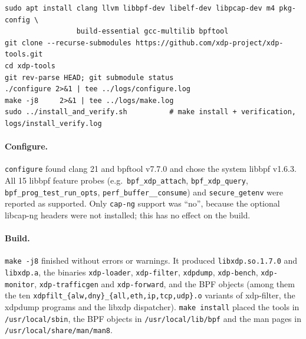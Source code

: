 \begin{lstlisting}[style=bashsh,float=htbp,caption={Download, configure, build and install xdp-tools.},label=lst:t5-build]
sudo apt install clang llvm libbpf-dev libelf-dev libpcap-dev m4 pkg-config \
                 build-essential gcc-multilib bpftool
git clone --recurse-submodules https://github.com/xdp-project/xdp-tools.git
cd xdp-tools
git rev-parse HEAD; git submodule status
./configure 2>&1 | tee ../logs/configure.log
make -j8     2>&1 | tee ../logs/make.log
sudo ../install_and_verify.sh          # make install + verification, logs/install_verify.log
\end{lstlisting}

\paragraph{Configure.} \texttt{configure} found clang 21 and bpftool v7.7.0 and chose the system libbpf v1.6.3. All 15 libbpf feature probes (e.g.\ \texttt{bpf\_xdp\_attach}, \texttt{bpf\_xdp\_query}, \texttt{bpf\_prog\_test\_run\_opts}, \texttt{perf\_buffer\_\_consume}) and \texttt{secure\_getenv} were reported as supported. Only \texttt{cap-ng} support was \enquote{no}, because the optional libcap-ng headers were not installed; this has no effect on the build.

\paragraph{Build.} \texttt{make -j8} finished without errors or warnings. It produced \texttt{libxdp.so.1.7.0} and \texttt{libxdp.a}, the binaries \texttt{xdp-loader}, \texttt{xdp-filter}, \texttt{xdpdump}, \texttt{xdp-bench}, \texttt{xdp-monitor}, \texttt{xdp-trafficgen} and \texttt{xdp-forward}, and the BPF objects (among them the ten \texttt{xdpfilt\_\{alw,dny\}\_\{all,eth,ip,tcp,udp\}.o} variants of xdp-filter, the xdpdump programs and the libxdp dispatcher). \texttt{make install} placed the tools in \texttt{/usr/local/sbin}, the BPF objects in \texttt{/usr/local/lib/bpf} and the man pages in \texttt{/usr/local/share/man/man8}.


